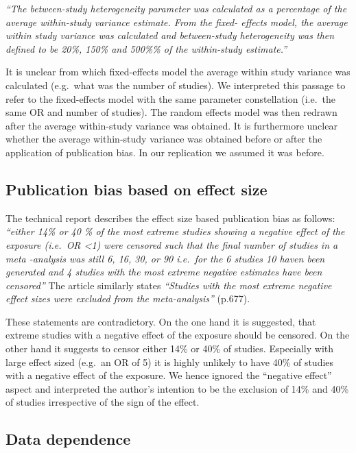 \documentclass[
  english,
  doc,floatsintext,draftall]{apa6}
\begin{document}
\emph{\enquote{The between-study heterogeneity parameter was calculated as a percentage of the average within-study variance estimate. From the fixed- effects model, the average within study variance was calculated and between-study heterogeneity was then defined to be 20\%, 150\% and 500\%\% of the within-study estimate.}}

It is unclear from which fixed-effects model the average within study variance was calculated (e.g.~what was the number of studies).
We interpreted this passage to refer to the fixed-effects model with the same parameter constellation (i.e.~the same OR and number of studies).
The random effects model was then redrawn after the average within-study variance was obtained.
It is furthermore unclear whether the average within-study variance was obtained before or after the application of publication bias.
In our replication we assumed it was before.

\hypertarget{publication-bias-based-on-effect-size}{%
\subsection{Publication bias based on effect size}\label{publication-bias-based-on-effect-size}}

The technical report describes the effect size based publication bias as follows:
\emph{\enquote{either 14\% or 40 \% of the most extreme studies showing a negative effect of the exposure (i.e.~OR \textless1) were censored such that the final number of studies in a meta -analysis was still 6, 16, 30, or 90 i.e.~for the 6 studies 10 haven been generated and 4 studies with the most extreme negative estimates have been censored}} The article similarly states \emph{\enquote{Studies with the most extreme negative effect sizes were excluded from the meta-analysis}} (p.677).

These statements are contradictory.
On the one hand it is suggested, that extreme studies with a negative effect of the exposure should be censored.
On the other hand it suggests to censor either 14\% or 40\% of studies.
Especially with large effect sized (e.g.~an OR of 5) it is highly unlikely to have 40\% of studies with a negative effect of the exposure.
We hence ignored the \enquote{negative effect} aspect and interpreted the author's intention to be the exclusion of 14\% and 40\% of studies irrespective of the sign of the effect.

\hypertarget{data-dependence}{%
\subsection{Data dependence}\label{data-dependence}}
\end{document}
